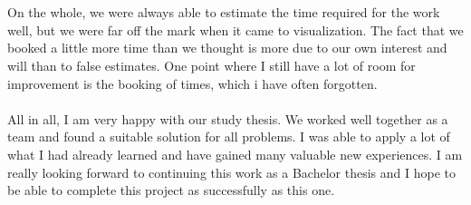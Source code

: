 \\\\
On the whole, we were always able to estimate the time required for the work well, but we were far off the mark when it came to visualization. The fact that we booked a little more time than we thought is more due to our own interest and will than to false estimates. One point where I still have a lot of room for improvement is the booking of times, which i have often forgotten.
\\\\
All in all, I am very happy with our study thesis. We worked well together as a team and found a suitable solution for all problems. I was able to apply a lot of what I had already learned and have gained many valuable new experiences. I am really looking forward to continuing this work as a Bachelor thesis and I hope to be able to complete this project as successfully as this one.
